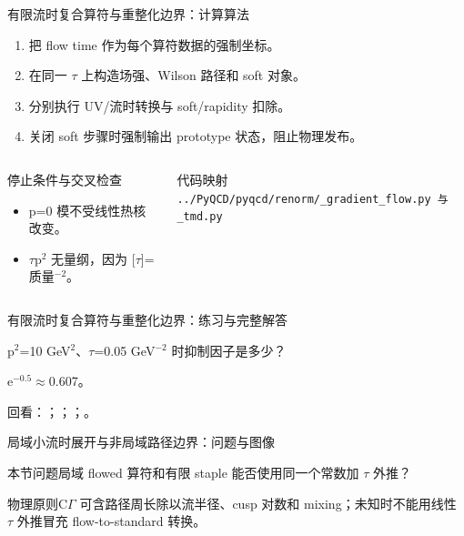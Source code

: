 \begin{frame}[t]{有限流时复合算符与重整化边界：计算算法}
\footnotesize
{}\begin{enumerate}
\item 把 flow time 作为每个算符数据的强制坐标。
\item 在同一 \ensuremath{\tau} 上构造场强、Wilson 路径和 soft 对象。
\item 分别执行 UV/\allowbreak{}流时转换与 soft/\allowbreak{}rapidity 扣除。
\item 关闭 soft 步骤时强制输出 prototype 状态，阻止物理发布。
\end{enumerate}\begin{columns}[T,onlytextwidth]
\begin{block}{停止条件与交叉检查}\scriptsize\begin{itemize}
\item[\CheckMark] p=0 模不受线性热核改变。
\item[\CheckMark] \ensuremath{\tau}p\ensuremath{^{2}} 无量纲，因为 [\ensuremath{\tau}]=质量\ensuremath{^{-2}}。
\end{itemize}\end{block}
\begin{block}{代码映射}
\scriptsize \texttt{.\allowbreak{}.\allowbreak{}/\allowbreak{}PyQCD/\allowbreak{}pyqcd/\allowbreak{}renorm/\allowbreak{}\_\allowbreak{}gradient\_\allowbreak{}flow.\allowbreak{}py 与 \_\allowbreak{}tmd.\allowbreak{}py}
\end{block}\end{columns}\end{frame}

\begin{frame}[t]{有限流时复合算符与重整化边界：练习与完整解答}
\footnotesize
\begin{block}{}p\ensuremath{^{2}}=10 GeV\ensuremath{^{2}}、\ensuremath{\tau}=0.05 GeV\ensuremath{^{-2}} 时抑制因子是多少？\end{block}
\begin{exampleblock}{}e\ensuremath{^{-0.5}}\ensuremath{\approx}0.607。\end{exampleblock}
\vfill
\scriptsize 回看：；；；。
\end{frame}

\begin{frame}[t]{局域小流时展开与非局域路径边界：问题与图像}
\footnotesize
\begin{block}{本节问题}局域 flowed 算符和有限 staple 能否使用同一个常数加 \ensuremath{\tau} 外推？\end{block}
\begin{block}{物理原则}\quad C\ensuremath{\Gamma} 可含路径周长除以流半径、cusp 对数和 mixing；未知时不能用线性 \ensuremath{\tau} 外推冒充 flow-to-standard 转换。\end{block}
\end{frame}

